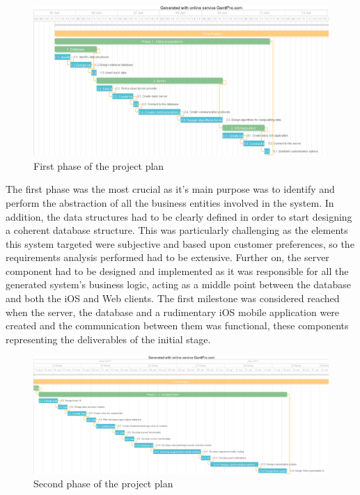 \begin{figure}[!ht]
\centering
\includegraphics[scale=0.2]{img/phase1.png}
\caption{First phase of the project plan}
\label{fig:phase1}
\end{figure}

The first phase was the most crucial as it's main purpose was to identify and perform the abstraction of all the business entities involved in the system. In addition, the data structures had to be clearly defined in order to start designing a coherent database structure. This was particularly challenging as the elements this system targeted were subjective and based upon customer preferences, so the requirements analysis performed had to be extensive. Further on, the server component had to be designed and implemented as it was responsible for all the generated system's business logic, acting as a middle point between the database and both the iOS and Web clients. The first milestone was considered reached when the server, the database and a rudimentary iOS mobile application were created and the communication between them was functional, these components representing the deliverables of the initial stage.\\

\begin{figure}[!ht]
\centering
\includegraphics[scale=0.2]{img/phase2.png}
\caption{Second phase of the project plan}
\label{fig:phase2}
\end{figure}

